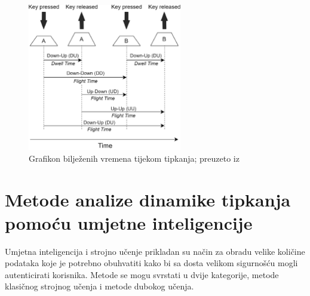 \documentclass[]{foi}
\begin{document}
\begin{figure}[!h]
    \centering
    \includegraphics[width=0.6\textwidth]{slike/tipkanje-graf.jpg}
    \caption{Grafikon bilježenih vremena tijekom tipkanja; preuzeto iz \cite{Dias2023}}
    \label{fig:graf-vremena-tipkanja}
\end{figure}


\chapter{Metode analize dinamike tipkanja pomoću umjetne inteligencije}
Umjetna inteligencija i strojno učenje prikladan su način za obradu velike količine podataka koje je potrebno obuhvatiti kako bi sa dosta velikom sigurnošću mogli autenticirati korisnika. Metode se mogu svrstati u dvije kategorije, metode klasičnog strojnog učenja i metode dubokog učenja.
\end{document}
